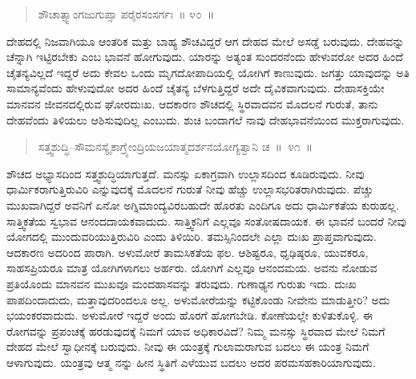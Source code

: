 \begin{verse}
ಶೌಚಾತ್ಸ್ವಾಂಗಜುಗುಪ್ಸಾ ಪರೈರಸಂಸರ್ಗಃ~॥ ೪೦~॥
\end{verse}

\vspace{-0.35cm}


ದೇಹದಲ್ಲಿ ನಿಜವಾಗಿಯೂ ಆಂತರಿಕ ಮತ್ತು ಬಾಹ್ಯ ಶೌಚವಿದ್ದರೆ ಆಗ ದೇಹದ ಮೇಲೆ ಅಸಡ್ಡೆ ಬರುವುದು. ದೇಹವನ್ನು ಚೆನ್ನಾಗಿ ಇಟ್ಟಿರಬೇಕು ಎಂಬ ಭಾವನೆ ಹೋಗುವುದು. ಯಾರನ್ನು ಅತ್ಯಂತ ಸುಂದರನೆಂದು ಹೇಳುವರೋ ಅದರ ಹಿಂದೆ ಚೈತನ್ಯವಿಲ್ಲದೆ ಇದ್ದರೆ ಅದು ಕೇವಲ ಒಂದು ಮೃಗದೋಪಾದಿಯಲ್ಲಿ ಯೋಗಿಗೆ ಕಾಣುವುದು. ಜಗತ್ತು ಯಾವುದನ್ನು ಅತಿ ಸಾಮಾನ್ಯವೆಂದು ಹೇಳುವುದೋ ಅದರ ಹಿಂದೆ ಚೈತನ್ಯ ಬೆಳಗುತ್ತಿದ್ದರೆ ಅದೇ ದೈವಿಕವಾಗುವುದು. ದೇಹಾಸಕ್ತಿಯೇ ಮಾನವನ ಜೀವನದಲ್ಲಿರುವ ಘೋರದುಃಖ. ಆದಕಾರಣ ಶೌಚದಲ್ಲಿ ಸ್ಥಿರವಾದವನ ಮೊದಲನೆ ಗುರುತೆ, ತಾನು ದೇಹವೆಂದು ತಿಳಿಯಲು ಆಶಿಸುವುದಿಲ್ಲ ಎಂಬುದು. ಶುಚಿ ಬಂದಾಗಲೆ ನಾವು ದೇಹಭಾವನೆಯಿಂದ ಮುಕ್ತರಾಗುವುದು. 

\vspace{-0.35cm}

\begin{verse}
ಸತ್ತ್ವಶುದ್ಧಿ–ಸೌಮನಸ್ಯೈಕಾಗ್ರ್ಯೇಂದ್ರಿಯಜಯಾತ್ಮದರ್ಶನಯೋಗ್ಯತ್ವಾನಿ ಚ~॥~೪೧~॥
\end{verse}

\vspace{-0.35cm}


ಶೌಚದ ಅಭ್ಯಾಸದಿಂದ ಸತ್ತ್ವಶುದ್ಧಿಯಾಗುತ್ತದೆ. ಮನಸ್ಸು ಏಕಾಗ್ರವಾಗಿ ಉಲ್ಲಾಸದಿಂದ ಕೂಡಿರುವುದು. ನೀವು ಧಾರ್ಮಿಕರಾಗುತ್ತಿರುವಿರಿ ಎನ್ನುವುದಕ್ಕೆ ಮೊದಲನೆ ಗುರುತೆ ನೀವು ಹೆಚ್ಚು ಉಲ್ಲಾಸಭರಿತರಾಗಿರುವುದು. ಪೆಚ್ಚು ಮುಖವಾಗಿದ್ದರೆ ಅವನಿಗೆ ಏನೋ ಅಗ್ನಿಮಾಂದ್ಯವಿರಬಹುದೇ ಹೊರತು ಎಂದಿಗೂ ಅದು ಧಾರ್ಮಿಕತೆಯ ಕುರುಹಲ್ಲ. ಸಾತ್ತ್ವಿಕತೆಯ ಸ್ವಭಾವ ಆನಂದದಾಯಕವಾದುದು. ಸಾತ್ತ್ವಿಕನಿಗೆ ಎಲ್ಲವೂ ಸಂತೋಷದಾಯಕ. ಈ ಭಾವನೆ ಬಂದರೆ ನೀವು ಯೋಗದಲ್ಲಿ ಮುಂದುವರಿಯುತ್ತಿರುವಿರಿ ಎಂದು ತಿಳಿಯಿರಿ. ತಮಸ್ಸಿನಿಂದಲೇ ಎಲ್ಲಾ ದುಃಖ ಪ್ರಾಪ್ತವಾಗುವುದು. ಆದಕಾರಣ ಅದರಿಂದ ಪಾರಾಗಿ. ಅಳುಮೋರೆ ತಾಮಸಿಕತೆಯ ಫಲ. ಆಶಿಷ್ಟರೂ, ಧೃಢಿಷ್ಠರೂ, ಯುವಕರೂ, ಸಾಹಸಪ್ರಿಯರೂ ಮಾತ್ರ ಯೋಗಿಗಳಾಗಲು ಅರ್ಹರು. ಯೋಗಿಗೆ ಎಲ್ಲವೂ ಆನಂದ\break ಮಯ. ಅವನು ನೋಡುವ ಪ್ರತಿಯೊಂದು ಮಾನವನ ಮುಖವೂ ಮಂದಹಾಸವನ್ನು ತರುವುದು. ಗುಣಾಢ್ಯನ ಗುರುತು ಇದು. ದುಃಖ ಪಾಪದಿಂದಾದುದು, ಮತ್ತಾವುದರಿಂದಲೂ ಅಲ್ಲ. ಅಳುಮೋರೆಯನ್ನು ಕಟ್ಟಿಕೊಂಡು ನೀವೇನು ಮಾಡುತ್ತೀರಿ? ಅದು ಭಯಂಕರವಾದುದು. ಅಳುಮೋರೆ ಇದ್ದರೆ ಅಂದು ಹೊರಗೆ ಹೋಗಬೇಡಿ. ಕೋಣೆಯಲ್ಲೇ ಕುಳಿತುಕೊಳ್ಳಿ. ಈ ರೋಗವನ್ನು ಪ್ರಪಂಚಕ್ಕೆ ಹರಡುವುದಕ್ಕೆ ನಿಮಗೆ ಯಾವ ಅಧಿಕಾರವಿದೆ? ನಿಮ್ಮ ಮನಸ್ಸು ಸ್ಥಿರವಾದ ಮೇಲೆ ನಿಮಗೆ ದೇಹದ ಮೇಲೆ ಸ್ವಾಧೀನಕ್ಕೆ  ಬರುವುದು. ನೀವು ಈ ಯಂತ್ರಕ್ಕೆ ಗುಲಾಮರಾಗುವ ಬದಲು ಈ ಯಂತ್ರ ನಿಮಗೆ ಆಳಾಗುವುದು. ಯಂತ್ರವು ಆತ್ಮ ನನ್ನು ಹೀನ ಸ್ಥಿತಿಗೆ ಎಳೆಯುವ ಬದಲು ಅದರ ಪರಮಸಹಕಾರಿಯಾಗುವುದು. 

